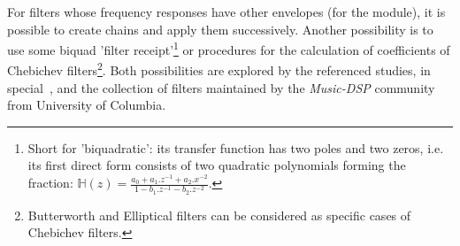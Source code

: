 \documentclass[
 aip,
 jmp,
 amsmath,amssymb,
 reprint,
]{revtex4-1}
\begin{document}
\begin{itemize}
For filters whose frequency responses have other envelopes (for the module), it is possible to create chains and apply them successively. Another possibility is to use some biquad 'filter receipt'\footnote{Short for 'biquadratic': its transfer function has two poles and two zeros, i.e. its first direct form consists of two quadratic polynomials forming the fraction: $\mathbb{H}(z)=\frac{a_0+a_1.z^{-1}+a_2.x^{-2}}{1- b_1.z^{-1} -b_2 . z^{-2}}$.} or procedures for the calculation of coefficients of Chebichev filters\footnote{Butterworth and Elliptical filters can be considered as specific cases of Chebichev filters.\cite{Openheim,smith}}.
Both possibilities are explored by the referenced studies, in special~\cite{JOSFM,smith}, and the collection of filters maintained by the \emph{Music-DSP} community from University of Columbia.\cite{music-dsp,Openheim}

\end{itemize}
\end{document}
